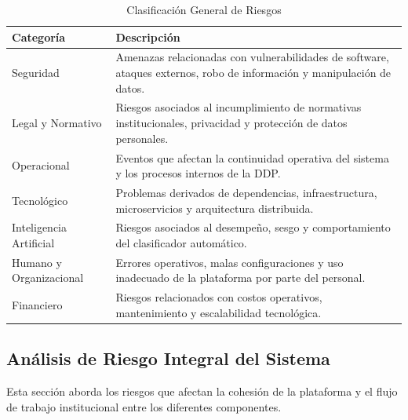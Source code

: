 \begin{table}[H]
\centering
\caption{Clasificación General de Riesgos}
\label{tab:clasificacion_riesgos}
\renewcommand{\arraystretch}{1.4}
\begin{tabular}{|p{3cm}|p{10cm}|}
\hline
\textbf{Categoría} & \textbf{Descripción} \\ \hline

Seguridad &
Amenazas relacionadas con vulnerabilidades de software, ataques externos, robo de información y manipulación de datos. \\ \hline

Legal y Normativo &
Riesgos asociados al incumplimiento de normativas institucionales, privacidad y protección de datos personales. \\ \hline

Operacional &
Eventos que afectan la continuidad operativa del sistema y los procesos internos de la DDP. \\ \hline

Tecnológico &
Problemas derivados de dependencias, infraestructura, microservicios y arquitectura distribuida. \\ \hline

Inteligencia Artificial &
Riesgos asociados al desempeño, sesgo y comportamiento del clasificador automático. \\ \hline

Humano y Organizacional &
Errores operativos, malas configuraciones y uso inadecuado de la plataforma por parte del personal. \\ \hline

Financiero &
Riesgos relacionados con costos operativos, mantenimiento y escalabilidad tecnológica. \\ \hline

\end{tabular}
\end{table}

\subsection{Análisis de Riesgo Integral del Sistema}

Esta sección aborda los riesgos que afectan la cohesión de la plataforma y el flujo de trabajo institucional entre los diferentes componentes.

